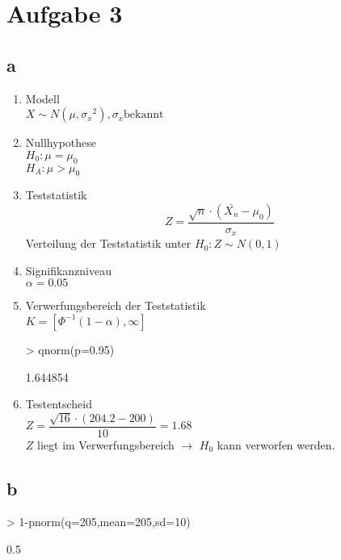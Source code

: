 

\section{Aufgabe 3}

\subsection{a}
\begin{enumerate}
  \item Modell \\
        $ X \sim N(\mu, {\sigma_x}^2), \sigma_x \text{bekannt} $
  \item Nullhypothese \\
        $ H_0: \mu = \mu_0 $ \\
        $ H_A: \mu > \mu_0 $
  \item Teststatistik \\
        \[ Z = \frac{\sqrt{n}\cdot (\bar{X_n} - \mu_0)}{\sigma_x} \] 
        Verteilung der Teststatistik unter $ H_0: Z \sim N(0,1) $
  \item Signifikanzniveau \\
        $ \alpha = 0.05 $
  \item Verwerfungsbereich der Teststatistik \\
        $ K = [\Phi^{-1}(1-\alpha), \infty] $
\begin{Schunk}
\begin{Sinput}
>         qnorm(p=0.95)
\end{Sinput}
\begin{Soutput}
[1] 1.644854
\end{Soutput}
\end{Schunk}
  \item Testentscheid \\
        $ Z = \dfrac{\sqrt{16} \cdot (204.2 - 200)}{10} = 1.68 $ \\
        $Z$ liegt im Verwerfungsbereich $\rightarrow$ $H_0$ kann verworfen 
        werden. 
\end{enumerate}

\subsection{b}
\begin{Schunk}
\begin{Sinput}
> 1-pnorm(q=205,mean=205,sd=10)
\end{Sinput}
\begin{Soutput}
[1] 0.5
\end{Soutput}
\end{Schunk}

